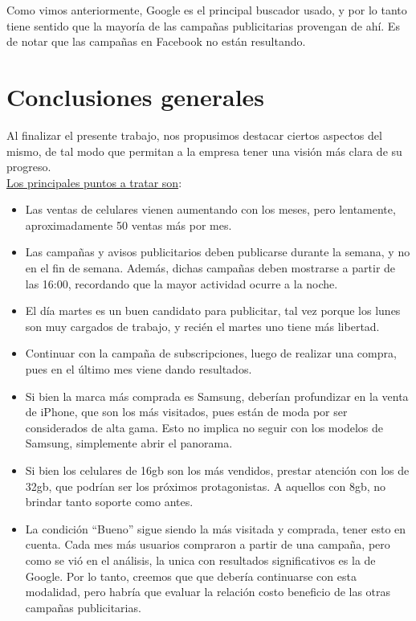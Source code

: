 \documentclass[a4paper ,12pt]{article}
\begin{document}
Como vimos anteriormente, Google es el principal buscador usado, y por lo tanto tiene sentido que la mayoría de las campañas publicitarias provengan de ahí. Es de notar que las campañas en Facebook no están resultando.
\newpage
\section{Conclusiones generales}

Al finalizar el presente trabajo, nos propusimos destacar ciertos aspectos del mismo, de tal modo que permitan a la empresa tener una visión más clara de su progreso.\\


\underline{Los principales puntos a tratar son}:

\begin{itemize}
	
\item Las ventas de celulares vienen aumentando con los meses, pero lentamente, aproximadamente 50 ventas más por mes.

\item Las campañas y avisos publicitarios deben publicarse durante la semana, y no en el fin de semana.
Además, dichas campañas deben mostrarse a partir de las 16:00, recordando que la mayor actividad ocurre a la noche.

\item El día martes es un buen candidato para publicitar, tal vez porque los lunes son muy cargados de trabajo, y recién el martes uno tiene más libertad.

\item Continuar con la campaña de subscripciones, luego de realizar una compra, pues en el último mes viene dando resultados.

\item Si bien la marca más comprada es Samsung, deberían profundizar en la venta de iPhone, que son los más visitados, pues están de moda por ser considerados de alta gama. Esto no implica no seguir con los modelos de Samsung, simplemente abrir el panorama.

\item Si bien los celulares de 16gb son los más vendidos, prestar atención con los de 32gb, que podrían ser los próximos protagonistas. A aquellos con 8gb, no brindar tanto soporte como antes.

\item La condición “Bueno” sigue siendo la más visitada y comprada, tener esto en cuenta.
Cada mes más usuarios compraron a partir de una campaña, pero como se vió en el análisis, la unica con resultados significativos es la de Google. Por lo tanto, creemos que que debería continuarse con esta modalidad, pero habría que evaluar la relación costo beneficio de las otras campañas publicitarias.


\end{itemize}
\end{document}
